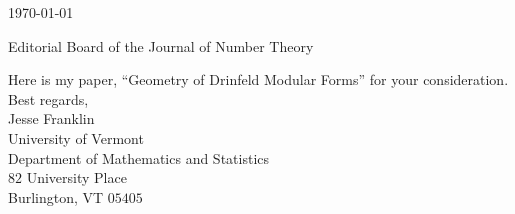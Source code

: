 \documentclass[12pt]{article}
\begin{document}
	
	\noindent
	\today
	
	\vspace{12pt}
	\noindent
	Editorial Board of the Journal of Number Theory
	\vspace{24pt}
	
	\noindent
	Here is my paper, ``Geometry of Drinfeld Modular Forms'' for your consideration. \\
	
	\noindent
	Best regards,\\
	
	\vspace{12pt}
	\noindent
	Jesse Franklin\\
	University of Vermont\\
	Department of Mathematics and Statistics\\
	$82$ University Place\\
	Burlington, VT $05405$
	
	
	
\end{document}
